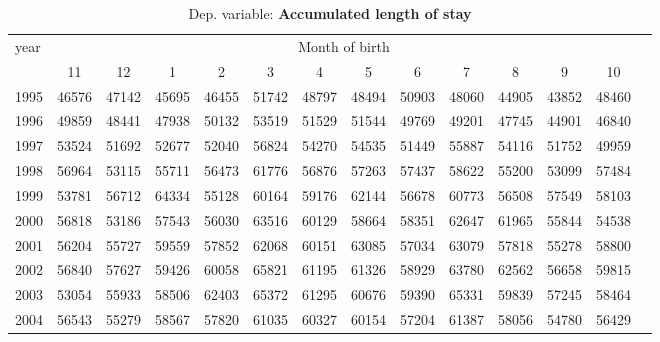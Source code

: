  \begin{table}[H] \begin{threeparttable} \centering \caption{Dep. variable: \textbf{Accumulated length of stay}} {\def\sym#1{\ifmmode^{#1}\else\(^{#1}\)\fi} \begin{tabular}{l*{13}{c}} \toprule year & \multicolumn{12}{c}{Month of birth} \\ \cmidrule(lr){2-13} 
            &          11&          12&           1&           2&           3&           4&           5&           6&           7&           8&           9&          10\\
1995        &       46576&       47142&       45695&       46455&       51742&       48797&       48494&       50903&       48060&       44905&       43852&       48460\\
1996        &       49859&       48441&       47938&       50132&       53519&       51529&       51544&       49769&       49201&       47745&       44901&       46840\\
1997        &       53524&       51692&       52677&       52040&       56824&       54270&       54535&       51449&       55887&       54116&       51752&       49959\\
1998        &       56964&       53115&       55711&       56473&       61776&       56876&       57263&       57437&       58622&       55200&       53099&       57484\\
1999        &       53781&       56712&       64334&       55128&       60164&       59176&       62144&       56678&       60773&       56508&       57549&       58103\\
2000        &       56818&       53186&       57543&       56030&       63516&       60129&       58664&       58351&       62647&       61965&       55844&       54538\\
2001        &       56204&       55727&       59559&       57852&       62068&       60151&       63085&       57034&       63079&       57818&       55278&       58800\\
2002        &       56840&       57627&       59426&       60058&       65821&       61195&       61326&       58929&       63780&       62562&       56658&       59815\\
2003        &       53054&       55933&       58506&       62403&       65372&       61295&       60676&       59390&       65331&       59839&       57245&       58464\\
2004        &       56543&       55279&       58567&       57820&       61035&       60327&       60154&       57204&       61387&       58056&       54780&       56429\\

\end{tabular}}
\end{threeparttable}
\end{table}
